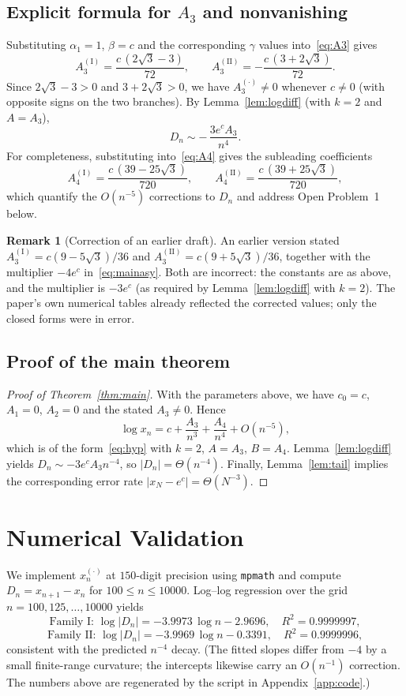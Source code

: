 \documentclass[11pt]{article}
\theoremstyle{definition}
\newtheorem{remark}[theorem]{Remark}
\begin{document}
\subsection{Explicit formula for $A_3$ and nonvanishing}\label{sec:sub}
Substituting $\alpha_1=1$, $\beta=c$ and the corresponding $\gamma$ values
into~\eqref{eq:A3} gives
\[
  A_3^{(\mathrm{I})} = \frac{c\,(2\sqrt3-3)}{72},
  \qquad
  A_3^{(\mathrm{II})} = -\frac{c\,(3+2\sqrt3)}{72}.
\]
Since $2\sqrt3-3>0$ and $3+2\sqrt3>0$, we have $A_3^{(\cdot)}\neq0$ whenever
$c\neq0$ (with opposite signs on the two branches). By
Lemma~\ref{lem:logdiff} (with $k=2$ and $A=A_3$),
\[
  D_n \sim -\,\frac{3e^{c}A_3}{n^{4}} .
\]
For completeness, substituting into~\eqref{eq:A4} gives the subleading
coefficients
\[
  A_4^{(\mathrm{I})} = \frac{c\,(39-25\sqrt3)}{720},
  \qquad
  A_4^{(\mathrm{II})} = \frac{c\,(39+25\sqrt3)}{720},
\]
which quantify the $O(n^{-5})$ corrections to $D_n$ and address
Open Problem~1 below.

\begin{remark}[Correction of an earlier draft]\label{rem:const}
An earlier version stated $A_3^{(\mathrm{I})}=c(9-5\sqrt3)/36$ and
$A_3^{(\mathrm{II})}=c(9+5\sqrt3)/36$, together with the multiplier $-4e^{c}$
in~\eqref{eq:mainasy}. Both are incorrect: the constants are as above, and the
multiplier is $-3e^{c}$ (as required by Lemma~\ref{lem:logdiff} with $k=2$). The
paper's own numerical tables already reflected the corrected values; only the
closed forms were in error.
\end{remark}

\subsection{Proof of the main theorem}
\begin{proof}[Proof of Theorem~\ref{thm:main}]
With the parameters above, we have $c_0=c$, $A_1=0$, $A_2=0$ and the stated
$A_3\neq0$. Hence
\[
  \log x_n = c + \frac{A_3}{n^3} + \frac{A_4}{n^4} + O(n^{-5}),
\]
which is of the form~\eqref{eq:hyp} with $k=2$, $A=A_3$, $B=A_4$.
Lemma~\ref{lem:logdiff} yields $D_n \sim -3e^{c}A_3 n^{-4}$, so
$|D_n|=\Theta(n^{-4})$. Finally, Lemma~\ref{lem:tail} implies the corresponding
error rate $|x_N-e^{c}| = \Theta(N^{-3})$.
\end{proof}

\section{Numerical Validation}
We implement $x_n^{(\cdot)}$ at $150$-digit precision using \texttt{mpmath} and
compute $D_n = x_{n+1}-x_n$ for $100\le n\le 10000$. Log--log regression over the
grid $n=100,125,\dots,10000$ yields
\[
  \text{Family I: } \log|D_n| = -3.9973\,\log n - 2.9696,\quad R^2=0.9999997,
\]
\[
  \text{Family II: } \log|D_n| = -3.9969\,\log n - 0.3391,\quad R^2=0.9999996,
\]
consistent with the predicted $n^{-4}$ decay. (The fitted slopes differ from
$-4$ by a small finite-range curvature; the intercepts likewise carry an
$O(n^{-1})$ correction. The numbers above are regenerated by the script in
Appendix~\ref{app:code}.)
\end{document}
